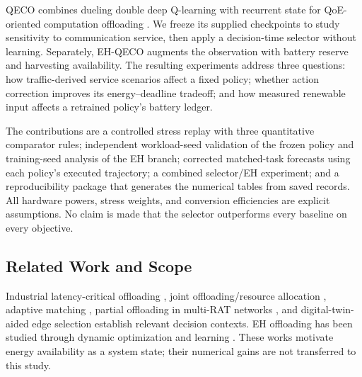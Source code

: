 \documentclass[conference]{IEEEtran}
\begin{document}
QECO combines dueling double deep Q-learning with recurrent state for QoE-oriented computation offloading \cite{QECO,QECOCode}. We freeze its supplied checkpoints to study sensitivity to communication service, then apply a decision-time selector without learning. Separately, EH-QECO augments the observation with battery reserve and harvesting availability. The resulting experiments address three questions: how traffic-derived service scenarios affect a fixed policy; whether action correction improves its energy--deadline tradeoff; and how measured renewable input affects a retrained policy's battery ledger.

The contributions are a controlled stress replay with three quantitative comparator rules; independent workload-seed validation of the frozen policy and training-seed analysis of the EH branch; corrected matched-task forecasts using each policy's executed trajectory; a combined selector/EH experiment; and a reproducibility package that generates the numerical tables from saved records. All hardware powers, stress weights, and conversion efficiencies are explicit assumptions. No claim is made that the selector outperforms every baseline on every objective.

\subsection{Related Work and Scope}
Industrial latency-critical offloading \cite{Mali2024_s3}, joint offloading/resource allocation \cite{Jiang2023_s30}, adaptive matching \cite{Chi2024_s26}, partial offloading in multi-RAT networks \cite{Qin2021_s31}, and digital-twin-aided edge selection \cite{DoDuy2022_s17} establish relevant decision contexts. EH offloading has been studied through dynamic optimization and learning \cite{Mao2016_s2,Min2017_s18,Mei2023_s23}. These works motivate energy availability as a system state; their numerical gains are not transferred to this study.
\end{document}
